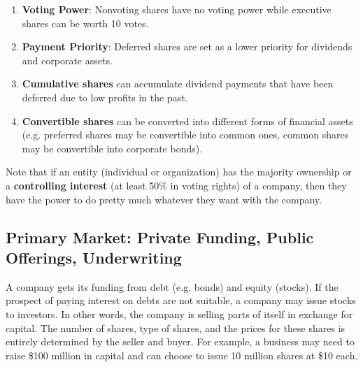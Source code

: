 \documentclass{article}
\begin{document}
  \begin{enumerate}
      \item \textbf{Voting Power}: Nonvoting shares have no voting power while executive shares can be worth 10 votes. 
      \item \textbf{Payment Priority}: Deferred shares are set as a lower priority for dividends and corporate assets. 
      \item \textbf{Cumulative shares} can accumulate dividend payments that have been deferred due to low profits in the past. 
      \item \textbf{Convertible shares} can be converted into different forms of financial assets (e.g. preferred shares may be convertible into common ones, common shares may be convertible into corporate bonds).
  \end{enumerate}
  Note that if an entity (individual or organization) has the majority ownership or a \textbf{controlling interest} (at least 50\% in voting rights) of a company, then they have the power to do pretty much whatever they want with the company. 

  \subsection{Primary Market: Private Funding, Public Offerings, Underwriting}

  A company gets its funding from debt (e.g. bonds) and equity (stocks). If the prospect of paying interest on debts are not suitable, a company may issue stocks to investors. In other words, the company is selling parts of itself in exchange for capital. The number of shares, type of shares, and the prices for these shares is entirely determined by the seller and buyer. For example, a business may need to raise \$100 million in capital and can choose to issue 10 million shares at \$10 each.
\end{document}

